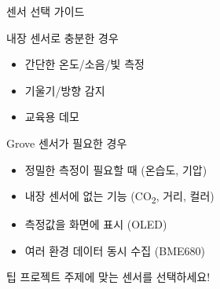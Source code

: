 \documentclass[aspectratio=169]{beamer}
\begin{document}
\begin{frame}{센서 선택 가이드}
  \begin{block}{내장 센서로 충분한 경우}
    \begin{itemize}
      \item 간단한 온도/소음/빛 측정
      \item 기울기/방향 감지
      \item 교육용 데모
    \end{itemize}
  \end{block}
  
  \vspace{0.5em}
  
  \begin{block}{Grove 센서가 필요한 경우}
    \begin{itemize}
      \item 정밀한 측정이 필요할 때 (온습도, 기압)
      \item 내장 센서에 없는 기능 (CO\textsubscript{2}, 거리, 컬러)
      \item 측정값을 화면에 표시 (OLED)
      \item 여러 환경 데이터 동시 수집 (BME680)
    \end{itemize}
  \end{block}
  
  \vspace{0.5em}
  
  \begin{alertblock}{팁}
    프로젝트 주제에 맞는 센서를 선택하세요!
  \end{alertblock}
\end{frame}
\end{document}
